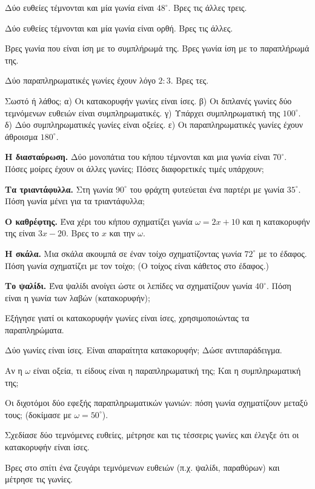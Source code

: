\ex Δύο ευθείες τέμνονται και μία γωνία είναι $48^\circ$. Βρες τις άλλες τρεις.

\ex Δύο ευθείες τέμνονται και μία γωνία είναι ορθή. Βρες τις άλλες.

\ex Βρες γωνία που είναι ίση με το συμπλήρωμά της. Βρες γωνία ίση με το παραπλήρωμά της.

\ex Δύο παραπληρωματικές γωνίες έχουν λόγο $2:3$. Βρες τες.

\ex Σωστό ή λάθος; α) Οι κατακορυφήν γωνίες είναι ίσες. \quad β) Οι διπλανές γωνίες δύο τεμνόμενων ευθειών είναι συμπληρωματικές. \quad γ) Υπάρχει συμπληρωματική της $100^\circ$. \quad δ) Δύο συμπληρωματικές γωνίες είναι οξείες. \quad ε) Οι παραπληρωματικές γωνίες έχουν άθροισμα $180^\circ$.


\ex \textbf{Η διασταύρωση.} Δύο μονοπάτια του κήπου τέμνονται και μια γωνία είναι $70^\circ$. Πόσες μοίρες έχουν οι άλλες γωνίες; Πόσες διαφορετικές τιμές υπάρχουν;

\ex \textbf{Τα τριαντάφυλλα.} Στη γωνία $90^\circ$ του φράχτη φυτεύεται ένα παρτέρι με γωνία $35^\circ$. Πόση γωνία μένει για τα τριαντάφυλλα;

\ex \textbf{Ο καθρέφτης.} Ένα χέρι του κήπου σχηματίζει γωνία $\omega=2x+10$ και η κατακορυφήν της είναι $3x-20$. Βρες το $x$ και την $\omega$.

\ex \textbf{Η σκάλα.} Μια σκάλα ακουμπά σε έναν τοίχο σχηματίζοντας γωνία $72^\circ$ με το έδαφος. Πόση γωνία σχηματίζει με τον τοίχο; (Ο τοίχος είναι κάθετος στο έδαφος.)

\ex \textbf{Το ψαλίδι.} Ένα ψαλίδι ανοίγει ώστε οι λεπίδες να σχηματίζουν γωνία $40^\circ$. Πόση είναι η γωνία των λαβών (κατακορυφήν);


\ex Εξήγησε γιατί οι κατακορυφήν γωνίες είναι ίσες, χρησιμοποιώντας τα παραπληρώματα.

\ex Δύο γωνίες είναι ίσες. Είναι απαραίτητα κατακορυφήν; Δώσε αντιπαράδειγμα.

\ex Αν η $\omega$ είναι οξεία, τι είδους είναι η παραπληρωματική της; Και η συμπληρωματική της;

\ex Οι διχοτόμοι δύο εφεξής παραπληρωματικών γωνιών: πόση γωνία σχηματίζουν μεταξύ τους; (δοκίμασε με $\omega=50^\circ$).


\ex Σχεδίασε δύο τεμνόμενες ευθείες, μέτρησε και τις τέσσερις γωνίες και έλεγξε ότι οι κατακορυφήν είναι ίσες.

\ex Βρες στο σπίτι ένα ζευγάρι τεμνόμενων ευθειών (π.χ. ψαλίδι, παραθύρων) και μέτρησε τις γωνίες.
